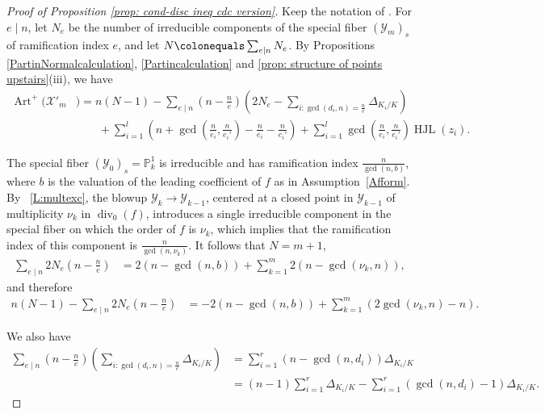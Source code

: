 \documentclass[12pt]{amsart}
\numberwithin{equation}{section}
\theoremstyle{definition}
\newcommand{\mc}[1]{\mathcal{#1}}
\renewcommand{\P}{\mathbb P}
\newcommand{\X}{\mathcal{X}}
\newcommand{\Y}{\mathcal{Y}}
\DeclareMathOperator{\divi}{div}
\DeclareMathOperator{\Art}{Art}
\DeclareMathOperator{\HJL}{HJL}
\begin{document}
\begin{proof}[Proof of Proposition \ref{prop: cond-disc ineq cdc version}]
Keep the notation of .  For $e\mid n$, let $N_e$ be the number of irreducible components of the special fiber $(\Y_m)_s$ of ramification index $e$, and let $N \colonequals \sum_{e\mid n}N_e$.
By Propositions \ref{PartinNormalcalculation}, \ref{Partincalculation} and \ref{prop: structure of points upstairs}(iii), we have
\begin{equation}\label{eq:artplus}
    \begin{aligned}
        \Art^+(\X'_m&)
        =n(N-1)-\sum_{e\mid n} \left(n-\frac{n}{e} \right) \left(2N_e-\sum_{i:\gcd(d_i,n)=\frac{n}{e}}\Delta_{K_i/K} \right)\\
        &\quad\quad+\sum_{i=1}
        ^l \left(n+\gcd \left(\frac{n}{e_i},\frac{n}{e_i'} \right)-\frac{n}{e_i}-\frac{n}{e_i'} \right)+\sum_{i=1}^l\gcd \left(\frac{n}{e_i},\frac{n}{e_i'} \right)\HJL(z_i). 
    \end{aligned}
    \end{equation}
    
    
    The special fiber $(\mc{Y}_0)_s=\P^1_k$ is irreducible and has
    ramification index $\frac{n}{\gcd(n,b)}$, where $b$ is the
    valuation of the leading coefficient of $f$ as in Assumption~\ref{Afform}. By ~\ref{L:multexc}, the blowup $\Y_k\to\Y_{k-1}$, centered at a closed point in $\Y_{k-1}$ of multiplicity $\nu_k$ in $\divi_0(f)$, introduces a single irreducible component in the special fiber on which the order of $f$ is $\nu_k$, which implies that the ramification index of this component is $\frac{n}{\gcd(n,\nu_k)}$. It follows that $N=m+1$,
    \begin{align*}
        \sum_{e\mid n}2N_e \left(n-\frac{n}{e} \right)&=2(n-\gcd(n,b))+\sum_{k=1}^m2(n-\gcd(\nu_k,n)),
    \end{align*}
    and therefore
    \begin{equation}\label{eq:compcount}
    \begin{aligned}
        n(N-1)-\sum_{e\mid n}2N_e \left( n-\frac{n}{e} \right)&=-2(n-\gcd(n,b))+ \sum_{k=1}^{m}(2\gcd(\nu_k,n)-n).
    \end{aligned}
    \end{equation}

    We also have
    \begin{equation}\label{eq:disc}
    \begin{aligned}
        \sum_{e\mid n} \left(n-\frac{n}{e} \right) \left(\sum_{i:\gcd(d_i,n)=\frac{n}{e}}\Delta_{K_i/K} \right)&=\sum_{i=1}^r(n-\gcd(n,d_i))\Delta_{K_i/K}
        \\&=(n-1)\sum_{i=1}^r\Delta_{K_i/K}-\sum_{i=1}^r(\gcd(n,d_i)-1)\Delta_{K_i/K}.
    \end{aligned}
    \end{equation}
    

\end{proof}
\end{document}

